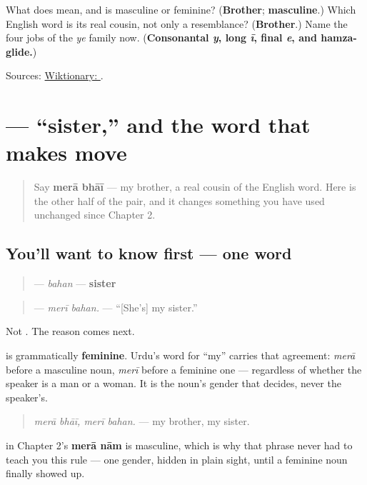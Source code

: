 \begin{tcolorbox}[breakable,colback=teal!4,colframe=teal!35!black,title={Before you move on}]
What does \textbf{} mean, and is \textbf{} masculine or feminine? (\textbf{Brother}; \textbf{masculine}.) Which English word is its real cousin, not only a resemblance? (\textbf{Brother}.) Name the four jobs of the \emph{ye} family now. (\textbf{Consonantal \emph{y}, long \emph{ī}, final \emph{e}, and hamza-glide.})

Sources: \href{https://en.wiktionary.org/wiki/\%D8\%A8\%DA\%BE\%D8\%A7\%D8\%A6\%DB\%8C}{Wiktionary: }.
\end{tcolorbox}
\section[\texorpdfstring{\ur{بہن} (bahan)}{بہن (bahan)}]{ — \textquotedblleft{}sister,\textquotedblright{} and the word that makes  move}

\label{lesson:UR-C09-bahan}



\begin{quote}
Say \textbf{merā bhāī} — my brother, a real cousin of the English word. Here is the other half of the pair, and it changes something you have used unchanged since Chapter 2.
\end{quote}

\subsection*{You'll want to know first — one word}
\begin{quote}
\textbf{} — \emph{bahan} — \textbf{sister}
\end{quote}

\begin{quote}
\textbf{ } — \emph{merī bahan.} — \textquotedblleft{}{[}She's{]} my sister.\textquotedblright{}
\end{quote}

Not \textbf{ }. The reason comes next.

\begin{grammarlens}[title={Grammar Lens: \ur{میرا} bends to the noun, not to you}]
\textbf{} is grammatically \textbf{feminine}. Urdu's word for \textquotedblleft{}my\textquotedblright{} carries that agreement: \textbf{} \emph{merā} before a masculine noun, \textbf{} \emph{merī} before a feminine one — regardless of whether the speaker is a man or a woman. It is the noun's gender that decides, never the speaker's.

\begin{quote}
\emph{merā bhāī, merī bahan.} — my brother, my sister.
\end{quote}

\textbf{} in Chapter 2's \textbf{merā nām} is masculine, which is why that phrase never had to teach you this rule — one gender, hidden in plain sight, until a feminine noun finally showed up.
\end{grammarlens}

